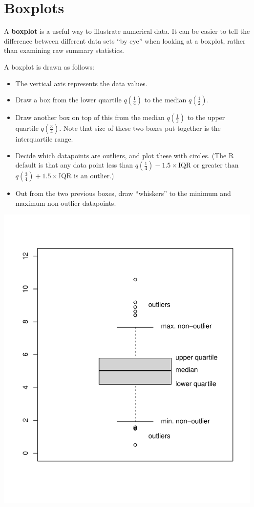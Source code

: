 \documentclass[
  a4paper,
]{book}
\providecommand{\tightlist}{%
  \setlength{\itemsep}{0pt}\setlength{\parskip}{0pt}}
\theoremstyle{definition}
\theoremstyle{definition}
\theoremstyle{definition}
\theoremstyle{definition}
\theoremstyle{remark}
\begin{document}
\hypertarget{boxplots}{%
\section{Boxplots}\label{boxplots}}

A \textbf{boxplot} is a useful way to illustrate numerical data. It can be easier to tell the difference between different data sets ``by eye'' when looking at a boxplot, rather than examining raw summary statistics.

A boxplot is drawn as follows:

\begin{itemize}
\tightlist
\item
  The vertical axis represents the data values.
\item
  Draw a box from the lower quartile \(q(\frac14)\) to the median \(q(\frac12)\).
\item
  Draw another box on top of this from the median \(q(\frac12)\) to the upper quartile \(q(\frac34)\). Note that size of these two boxes put together is the interquartile range.
\item
  Decide which datapoints are outliers, and plot these with circles. (The R default is that any data point less than \(q(\frac14) - 1.5 \times \text{IQR}\) or greater than \(q(\frac34) + 1.5 \times \text{IQR}\) is an outlier.)
\item
  Out from the two previous boxes, draw ``whiskers'' to the minimum and maximum non-outlier datapoints.
\end{itemize}

\begin{center}\includegraphics{math1710_files/figure-latex/boxplot1-1} \end{center}
\end{document}
